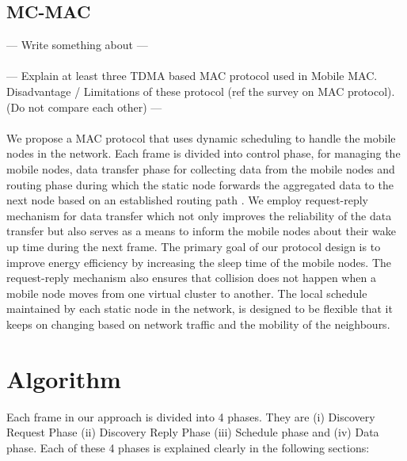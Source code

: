 \documentclass[a4paper, conference, 10pt]{IEEEtran}
\begin{document}
\subsection{MC-MAC}
--- Write something about \cite{mc-mac} ---\\ \\


--- Explain at least three TDMA based MAC protocol used in Mobile MAC. Disadvantage / Limitations of these protocol (ref the survey on MAC protocol). (Do not compare each other) ---\\ \\

We propose a MAC protocol that uses dynamic scheduling to handle the mobile nodes in the network. Each frame is divided into control phase, for managing the mobile nodes, data transfer phase for collecting data from the mobile nodes and routing phase during which the static node forwards the aggregated data to the next node based on an established routing path \cite{aodv}. We employ request-reply mechanism for data transfer which not only improves the reliability of the data transfer but also serves as a means to inform the mobile nodes about their wake up time during the next frame. The primary goal of our protocol design is to improve energy efficiency by increasing the sleep time of the mobile nodes. The request-reply mechanism also ensures that collision does not happen when a mobile node moves from one virtual cluster \cite{smac} to another. The local schedule maintained by each static node in the network, is designed to be flexible that it keeps on changing based on network traffic and the mobility of the neighbours.


\section{Algorithm}
\label{algo}

Each frame in our approach is divided into 4 phases. They are (i) Discovery Request Phase (ii) Discovery Reply Phase (iii) Schedule phase and (iv) Data phase. Each of these 4 phases is explained clearly in the following sections:
\end{document}
